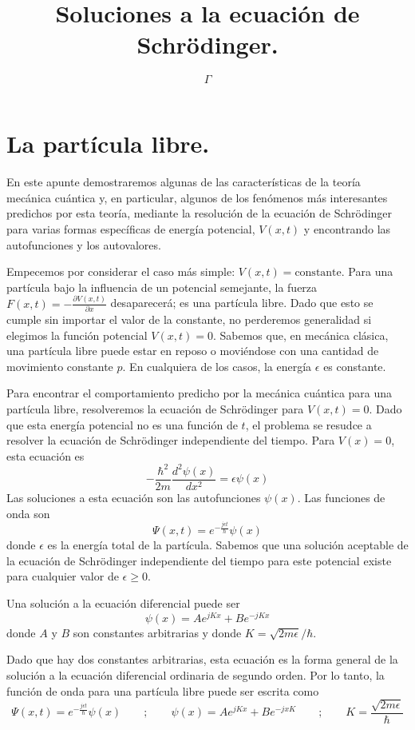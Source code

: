\documentclass[12pt,a4paper]{article}
\def\e{{\epsilon}} %
\begin{document}
\title{Soluciones a la ecuación de Schrödinger.}

\author{$\Gamma$}

\maketitle

\section{La partícula libre.}

En este apunte demostraremos algunas de las características de la teoría mecánica cuántica y, en particular, algunos de los fenómenos más interesantes predichos por esta teoría, mediante la resolución de la ecuación de Schrödinger para varias formas específicas de energía potencial, $V(x,t)$ y encontrando las autofunciones y los autovalores.

Empecemos por considerar el caso más simple: $V(x,t)=\textrm{constante}$. Para una partícula bajo la influencia de un potencial semejante, la fuerza $F(x,t)=-\frac{\partial V(x,t)}{\partial x}$ desaparecerá; es una partícula libre. Dado que esto se cumple sin importar el valor de la constante, no perderemos generalidad si elegimos la función potencial $V(x,t)=0$. Sabemos que, en mecánica clásica, una partícula libre puede estar en reposo o moviéndose con una cantidad de movimiento constante $p$. En cualquiera de los casos, la energía $\e$ es constante.

Para encontrar el comportamiento predicho por la mecánica cuántica para una partícula libre, resolveremos la ecuación de Schrödinger para $V(x,t)=0$. Dado que esta energía potencial no es una función de $t$, el problema se resudce a resolver la ecuación de Schrödinger independiente del tiempo. Para $V(x)=0$, esta ecuación es
\[ - \frac{\hbar^{2}}{2m} \frac{d^{2} \psi (x)}{dx^{2}}=\e \psi (x) \]
Las soluciones a esta ecuación son las autofunciones $\psi (x)$. Las funciones de onda son
\[ \Psi (x,t)=e^{-\frac{j\e t}{\hbar}}\psi (x) \]
donde $\e$ es la energía total de la partícula. Sabemos que una solución aceptable de la ecuación de Schrödinger independiente del tiempo para este potencial existe para cualquier valor de $\e \geq 0$.

Una solución a la ecuación diferencial puede ser
\[ \psi (x)=Ae^{jKx}+Be^{-jKx} \]
donde $A$ y $B$ son constantes arbitrarias y donde $K=\sqrt{2m\e}/\hbar$.

Dado que hay dos constantes arbitrarias, esta ecuación es la forma general de la solución a la ecuación diferencial ordinaria de segundo orden. Por lo tanto, la función de onda para una partícula libre puede ser escrita como
\[ \Psi (x,t)=e^{-\frac{j \e t}{\hbar}} \psi (x) \qquad ; \qquad \psi (x)=Ae^{jKx}+Be^{-jxK} \qquad ; \qquad K=\frac{\sqrt{2m\e}}{\hbar} \]
\end{document}
